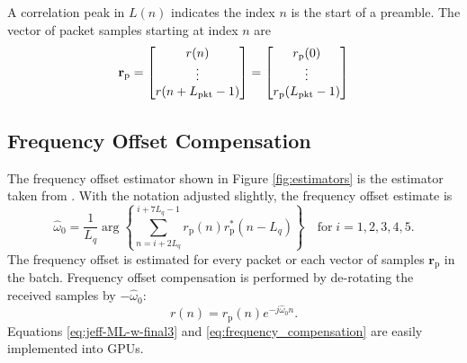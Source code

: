 A correlation peak in $L(n)$ indicates the index $n$ is the start of a preamble.
The vector of packet samples starting at index $n$ are
\begin{equation}
\mathbf{r}_\text{p} = 
\begin{bmatrix}
r(n) \\ 
\vdots \\ 
r(n+L_\text{pkt}-1)
\end{bmatrix}
=
\begin{bmatrix}
r_\text{p}(0) \\ 
\vdots \\ 
r_\text{p}(L_\text{pkt}-1)
\end{bmatrix}
\end{equation}

\subsection{Frequency Offset Compensation}
\label{sec:freq_offset_comp}
The frequency offset estimator shown in Figure \ref{fig:estimators} is the estimator taken from \cite[eq. (24)]{rice2014frequency}.
With the notation adjusted slightly, the frequency offset estimate is
\begin{equation}
	\hat{\omega}_0 = \frac{1}{L_q} \arg\left\{ \sum_{n=i+2L_q}^{i+7L_q-1} r_\text{p}(n)r_\text{p}^\ast(n-L_q)\right\}
	\quad
\text{for} \;
i=1,2,3,4,5.
	\label{eq:jeff-ML-w-final3}
\end{equation}
The frequency offset is estimated for every packet or each vector of samples $\mathbf{r}_\text{p}$ in the batch.
Frequency offset compensation is performed by de-rotating the received samples by $-\hat{\omega}_0$:
\begin{equation}
	r(n) = r_\text{p}(n) e^{-j\hat{\omega}_0n}.
	\label{eq:frequency_compensation}
\end{equation}
Equations \eqref{eq:jeff-ML-w-final3} and \eqref{eq:frequency_compensation} are easily implemented into GPUs. 

